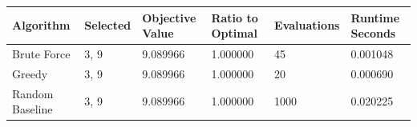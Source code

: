 \begin{tabular}{llllll}
\hline
Algorithm & Selected & Objective Value & Ratio to Optimal & Evaluations & Runtime Seconds \\
\hline
Brute Force & {3, 9} & 9.089966 & 1.000000 & 45 & 0.001048 \\
Greedy & {3, 9} & 9.089966 & 1.000000 & 20 & 0.000690 \\
Random Baseline & {3, 9} & 9.089966 & 1.000000 & 1000 & 0.020225 \\
\hline
\end{tabular}

